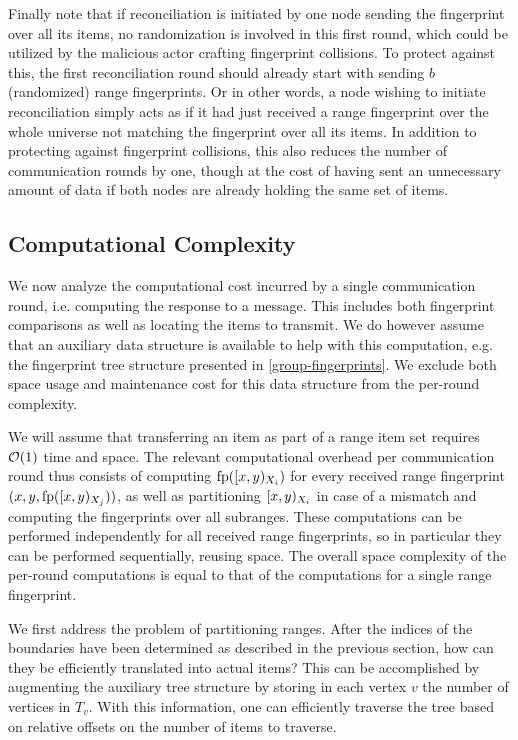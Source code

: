 Finally note that if reconciliation is initiated by one node sending the fingerprint over all its items, no randomization is involved in this first round, which could be utilized by the malicious actor crafting fingerprint collisions. To protect against this, the first reconciliation round should already start with sending $b$ (randomized) range fingerprints. Or in other words, a node wishing to initiate reconciliation simply acts as if it had just received a range fingerprint over the whole universe not matching the fingerprint over all its items. In addition to protecting against fingerprint collisions, this also reduces the number of communication rounds by one, though at the cost of having sent an unnecessary amount of data if both nodes are already holding the same set of items.

\subsection{Computational Complexity}

We now analyze the computational cost incurred by a single communication round, i.e. computing the response to a message. This includes both fingerprint comparisons as well as locating the items to transmit. We do however assume that an auxiliary data structure is available to help with this computation, e.g. the fingerprint tree structure presented in \cref{group-fingerprints}. We exclude both space usage and maintenance cost for this data structure from the per-round complexity.

We will assume that transferring an item as part of a range item set requires $\mathcal{O}(1)$ time and space. The relevant computational overhead per communication round thus consists of computing $\operatorname{fp}([{x},{y})_{X_i})$ for every received range fingerprint $({x}, {y}, {\operatorname{fp}([{x},{y})_{X_j})})$, as well as partitioning $[{x},{y})_{X_i}$ in case of a mismatch and computing the fingerprints over all subranges. These computations can be performed independently for all received range fingerprints, so in particular they can be performed sequentially, reusing space. The overall space complexity of the per-round computations is equal to that of the computations for a single range fingerprint.

We first address the problem of partitioning ranges. After the indices of the boundaries have been determined as described in the previous section, how can they be efficiently translated into actual items? This can be accomplished by augmenting the auxiliary tree structure by storing in each vertex $v$ the number of vertices in $T_v$. With this information, one can efficiently traverse the tree based on relative offsets on the number of items to traverse.

